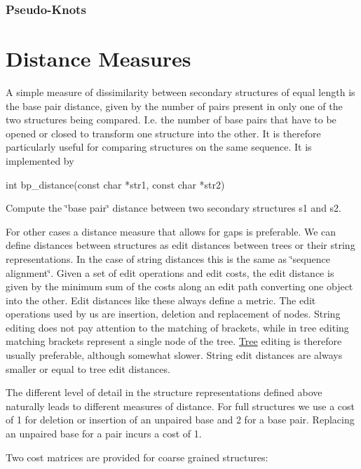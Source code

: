 \hypertarget{secondary_structures_pseudo-knots}{}\subsubsection{Pseudo-\/\+Knots}\label{secondary_structures_pseudo-knots}
\hypertarget{distance_measures}{}\section{Distance Measures}\label{distance_measures}
A simple measure of dissimilarity between secondary structures of equal length is the base pair distance, given by the number of pairs present in only one of the two structures being compared. I.\+e. the number of base pairs that have to be opened or closed to transform one structure into the other. It is therefore particularly useful for comparing structures on the same sequence. It is implemented by

\begin{DoxyVerb}int bp_distance(const char *str1,
                const char *str2)
\end{DoxyVerb}
 Compute the \char`\"{}base pair\char`\"{} distance between two secondary structures s1 and s2.

For other cases a distance measure that allows for gaps is preferable. We can define distances between structures as edit distances between trees or their string representations. In the case of string distances this is the same as \char`\"{}sequence alignment\char`\"{}. Given a set of edit operations and edit costs, the edit distance is given by the minimum sum of the costs along an edit path converting one object into the other. Edit distances like these always define a metric. The edit operations used by us are insertion, deletion and replacement of nodes. String editing does not pay attention to the matching of brackets, while in tree editing matching brackets represent a single node of the tree. \hyperlink{structTree}{Tree} editing is therefore usually preferable, although somewhat slower. String edit distances are always smaller or equal to tree edit distances.

The different level of detail in the structure representations defined above naturally leads to different measures of distance. For full structures we use a cost of 1 for deletion or insertion of an unpaired base and 2 for a base pair. Replacing an unpaired base for a pair incurs a cost of 1.

Two cost matrices are provided for coarse grained structures\+:

